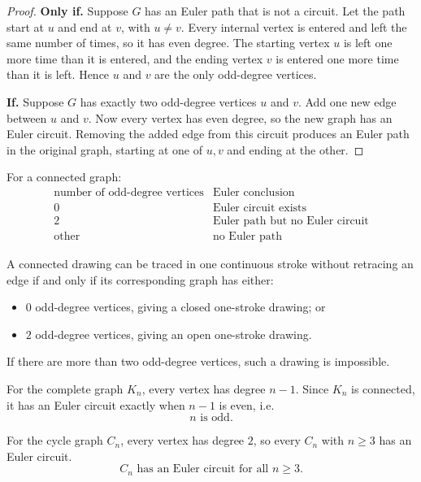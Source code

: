 \begin{proof}
\textbf{Only if.}
Suppose \(G\) has an Euler path that is not a circuit. Let the path start at \(u\) and end at \(v\), with \(u\neq v\). Every internal vertex is entered and left the same number of times, so it has even degree. The starting vertex \(u\) is left one more time than it is entered, and the ending vertex \(v\) is entered one more time than it is left. Hence \(u\) and \(v\) are the only odd-degree vertices.

\textbf{If.}
Suppose \(G\) has exactly two odd-degree vertices \(u\) and \(v\). Add one new edge between \(u\) and \(v\). Now every vertex has even degree, so the new graph has an Euler circuit. Removing the added edge from this circuit produces an Euler path in the original graph, starting at one of \(u,v\) and ending at the other.
\end{proof}

\begin{keyformula}[title={Euler path test}]
For a connected graph:
\[
\begin{array}{c|c}
\text{number of odd-degree vertices} & \text{Euler conclusion} \\ \hline
0 & \text{Euler circuit exists} \\
2 & \text{Euler path but no Euler circuit} \\
\text{other} & \text{no Euler path}
\end{array}
\]
\end{keyformula}

\begin{examplebox}[title={One-stroke drawing criterion}]
A connected drawing can be traced in one continuous stroke without retracing an edge if and only if its corresponding graph has either:
\begin{itemize}[leftmargin=*]
    \item \(0\) odd-degree vertices, giving a closed one-stroke drawing; or
    \item \(2\) odd-degree vertices, giving an open one-stroke drawing.
\end{itemize}
If there are more than two odd-degree vertices, such a drawing is impossible.
\end{examplebox}

\begin{examplebox}[title={Tutorial 8, Question 7}]
For the complete graph \(K_n\), every vertex has degree \(n-1\). Since \(K_n\) is connected, it has an Euler circuit exactly when \(n-1\) is even, i.e.
\[
\boxed{n\text{ is odd}.}
\]

For the cycle graph \(C_n\), every vertex has degree \(2\), so every \(C_n\) with \(n\ge 3\) has an Euler circuit.
\[
\boxed{C_n\text{ has an Euler circuit for all }n\ge 3.}
\]
\end{examplebox}

